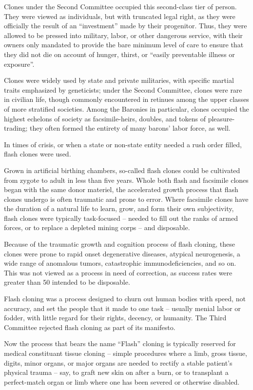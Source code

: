 Clones under the Second Committee occupied this second-class tier of person. They were
viewed as individuals, but with truncated legal right, as they were officially the result of an
``investment'' made by their progenitor. Thus, they were allowed to be pressed into military, labor,
or other dangerous service, with their owners only mandated to provide the bare minimum level
of care to ensure that they did not die on account of hunger, thirst, or ``easily preventable illness
or exposure''.

Clones were widely used by state and private militaries, with specific martial traits emphasized
by geneticists; under the Second Committee, clones were rare in civilian life, though commonly
encountered in retinues among the upper classes of more stratified societies. Among the
Baronies in particular, clones occupied the highest echelons of society as facsimile-heirs,
doubles, and tokens of pleasure-trading; they often formed the entirety of many barons’ labor
force, as well.

In times of crisis, or when a state or non-state entity needed a rush order filled, flash clones were
used.

Grown in artificial birthing chambers, so-called flash clones could be cultivated from zygote to
adult in less than five years. Whole both flash and facsimile clones began with the same donor
materiel, the accelerated growth process that flash clones undergo is often traumatic and prone
to error. Where facsimile clones have the duration of a natural life to learn, grow, and form their
own subjectivity, flash clones were typically task-focused -- needed to fill out the ranks of armed
forces, or to replace a depleted mining corps -- and disposable.

Because of the traumatic growth and cognition process of flash cloning, these clones were prone
to rapid onset degenerative diseases, atypical neurogenesis, a wide range of anomalous tumors,
catastrophic immunodeficiencies, and so on. This was not viewed as a process in need of
correction, as success rates were greater than 50%
intended to be disposable.

Flash cloning was a process designed to churn out human bodies with speed, not accuracy, and
set the people that it made to one task -- usually menial labor or fodder, with little regard for their
rights, decency, or humanity. The Third Committee rejected flash cloning as part of its manifesto.

Now the process that bears the name ``Flash'' cloning is typically reserved for medical
constituant tissue cloning -- simple procedures where a limb, gross tissue, digits, minor organs,
or major organs are needed to rectify a stable patient’s physical trauma -- say, to graft new skin
on after a burn, or to transplant a perfect-match organ or limb where one has been severed or
otherwise disabled.


